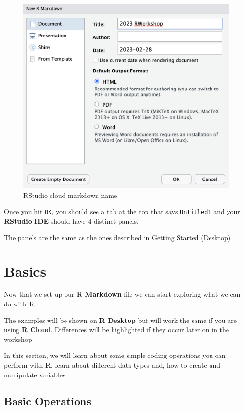 \documentclass[
]{book}
\begin{document}
\begin{figure}
\includegraphics[width=16.14in]{images/2.4rmarkdown} \caption{RStudio cloud markdown name}\label{fig:unnamed-chunk-13}
\end{figure}

Once you hit \texttt{OK}, you should see a tab at the top that says \texttt{Untitled1} and your \textbf{RStudio IDE} should have 4 distinct panels.

The panels are the same as the ones described in \protect\hyperlink{getting-started-desktop}{Getting Started (Desktop)}

\hypertarget{basics}{%
\chapter{Basics}\label{basics}}

Now that we set-up our \textbf{R Markdown} file we can start exploring what we can do with \textbf{R}

The examples will be shown on \textbf{R Desktop} but will work the same if you are using \textbf{R Cloud}. Differences will be highlighted if they occur later on in the workshop.

In this section, we will learn about some simple coding operations you can perform with \textbf{R}, learn about different data types and, how to create and manipulate variables.

\hypertarget{basic-operations}{%
\section{Basic Operations}\label{basic-operations}}
\end{document}
